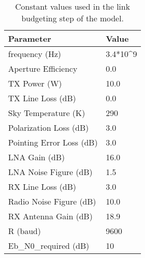 \begin{table}[!ht]
\centering
\begin{tabular}{|p{}|p{}|}
\hline
\textbf{Parameter}      & \textbf{Value}            \\ \hline
frequency (Hz)          & 3.4*10\textasciicircum{}9 \\ \hline
Aperture Efficiency     & 0.0                       \\ \hline
TX Power (W)            & 10.0                      \\ \hline
TX Line Loss (dB)       & 0.0                       \\ \hline
Sky Temperature (K)      & 290                       \\ \hline
Polarization Loss (dB)   & 3.0                       \\ \hline
Pointing Error Loss (dB)  & 3.0                       \\ \hline
LNA Gain (dB)           & 16.0                      \\ \hline
LNA Noise Figure (dB)   & 1.5                       \\ \hline
RX Line Loss (dB)       & 3.0                       \\ \hline
Radio Noise Figure (dB) & 10.0                      \\ \hline
RX Antenna Gain (dB)    & 18.9                      \\ \hline
R (baud)                & 9600                      \\ \hline
Eb\_N0\_required (dB)   & 10                        \\ \hline
\end{tabular}
\vspace{2 mm}
\caption{Constant values used in the link budgeting step of the model.}
\label{DownlinkParameters}
\end{table}



